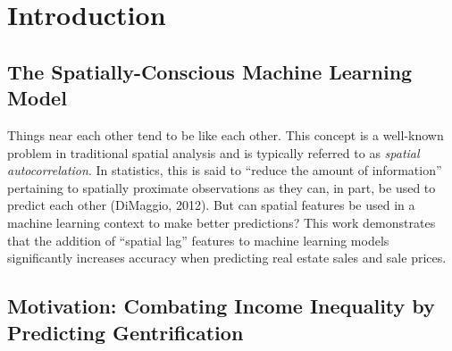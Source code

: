\documentclass[conference,final,]{IEEEtran}
\begin{document}




\maketitle


%
\IEEEpeerreviewmaketitle


\hypertarget{introduction}{%
\section{Introduction}\label{introduction}}

\hypertarget{the-spatially-conscious-machine-learning-model}{%
\subsection{The Spatially-Conscious Machine Learning
Model}\label{the-spatially-conscious-machine-learning-model}}

Things near each other tend to be like each other. This concept is a
well-known problem in traditional spatial analysis and is typically
referred to as \emph{spatial autocorrelation}. In statistics, this is
said to ``reduce the amount of information'' pertaining to spatially
proximate observations as they can, in part, be used to predict each
other (DiMaggio, 2012). But can spatial features be used in a machine
learning context to make better predictions? This work demonstrates that
the addition of ``spatial lag'' features to machine learning models
significantly increases accuracy when predicting real estate sales and
sale prices.

\hypertarget{motivation-combating-income-inequality-by-predicting-gentrification}{%
\subsection{Motivation: Combating Income Inequality by Predicting
Gentrification}\label{motivation-combating-income-inequality-by-predicting-gentrification}}
\end{document}
